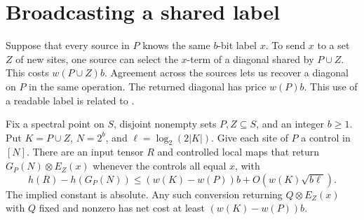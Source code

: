 \section{Broadcasting a shared label}\label{sec:copy}

Suppose that every source in \(P\) knows the same \(b\)-bit label \(x\).
To send \(x\) to a set \(Z\) of new sites, one source can select the
\(x\)-term of a diagonal shared by \(P\cup Z\). This costs \(w(P\cup Z)b\).
Agreement across the sources lets us recover a diagonal on \(P\) in the
same operation. The returned diagonal has price \(w(P)b\).
This use of a readable label is related to
\cite[Proposition~]{oaG}.

\begin{lemma}[Broadcasting]\label{lem:copy}
Fix a spectral point on \(S\), disjoint nonempty sets \(P,Z\subseteq S\),
and an integer \(b\ge1\). Put \(K=P\cup Z\), \(N=2^b\), and
\(\ell=\log_2(2|K|)\). Give each site of \(P\) a control in \([N]\).
There are an input tensor \(R\) and controlled local maps that return
\(G_P(N)\otimes E_Z(x)\) whenever the controls all equal \(x\), with
\[
 h(R)-h(G_P(N))
       \le (w(K)-w(P))b+O\!\left(w(K)\sqrt{b\ell}\right).
\]
The implied constant is absolute. Any such conversion returning
\(Q\otimes E_Z(x)\) with \(Q\) fixed and nonzero has net cost at least
\((w(K)-w(P))b\).
\end{lemma}

